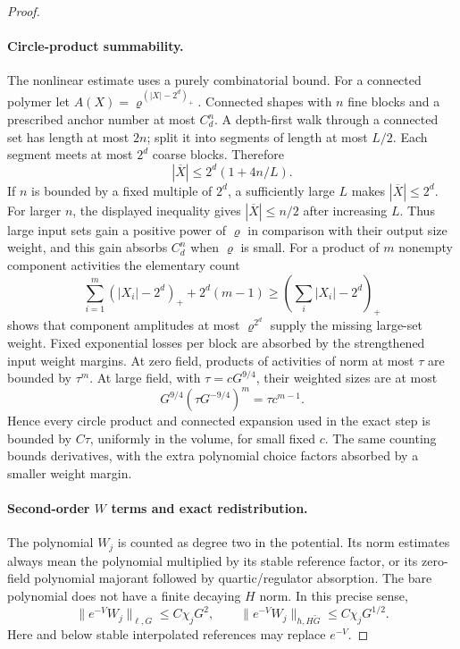 \documentclass[11pt]{article}
\begin{document}
\begin{proof}
\paragraph{Circle-product summability.}
The nonlinear estimate uses a purely combinatorial bound. For a connected
polymer let \(A(X)=\varrho^{(|X|-2^d)_+}\). Connected shapes with
\(n\) fine blocks and a prescribed anchor number at most \(C_d^n\).
A depth-first walk through a connected set has length at most \(2n\);
split it into segments of length at most \(L/2\). Each segment meets at
most \(2^d\) coarse blocks. Therefore
\[
 |\overline X|\le2^d(1+4n/L).
\]
If \(n\) is bounded by a fixed multiple of \(2^d\), a sufficiently
large \(L\) makes \(|\overline X|\le2^d\). For larger \(n\), the
displayed inequality gives \(|\overline X|\le n/2\) after increasing
\(L\). Thus large input sets gain a positive power of \(\varrho\)
in comparison with their output size weight, and this gain absorbs
\(C_d^n\) when \(\varrho\) is small.
For a product of \(m\) nonempty component activities the elementary
count
\[
 \sum_{i=1}^m(|X_i|-2^d)_++2^d(m-1)
       \ge\left(\sum_i|X_i|-2^d\right)_+
\]
shows that component amplitudes at most \(\varrho^{2^d}\) supply the
missing large-set weight. Fixed exponential losses per block are
absorbed by the strengthened input weight margins. At zero field,
products of activities of norm at most \(\tau\) are bounded by
\(\tau^m\). At large field, with \(\tau=cG^{9/4}\), their weighted
sizes are at most
\[
 G^{9/4}(\tau G^{-9/4})^m=\tau c^{m-1}.
\]
Hence every circle product and connected expansion used in the exact
step is bounded by \(C\tau\), uniformly in the volume, for small fixed
\(c\). The same counting bounds derivatives, with the extra polynomial
choice factors absorbed by a smaller weight margin.

\paragraph{Second-order \(W\) terms and exact redistribution.}
The polynomial \(W_j\) is counted as degree two in the potential.
Its norm estimates always mean the polynomial multiplied by its stable
reference factor, or its zero-field polynomial majorant followed by
quartic/regulator absorption. The bare polynomial does not have a
finite decaying \(H\) norm. In this precise sense,
\begin{equation}\label{completion:W-bounds}
 \|e^{-V}W_j\|_{\ell,G}\le C\chi_jG^2,\qquad
 \|e^{-V}W_j\|_{h,H\widetilde G}\le C\chi_jG^{1/2}.
\end{equation}
Here and below stable interpolated references may replace \(e^{-V}\).


\end{proof}
\end{document}
